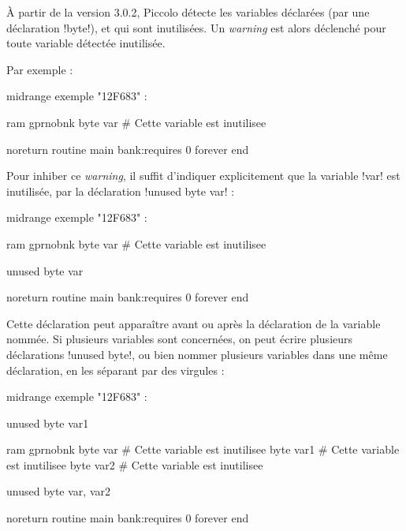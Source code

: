 
À partir de la version 3.0.2, Piccolo détecte les variables déclarées (par une déclaration \pic!byte!), et qui sont inutilisées. Un \emph{warning} est alors déclenché pour toute variable détectée inutilisée.

Par exemple :

\begin{piccolo}
midrange exemple "12F683" :

ram gprnobnk {
  byte var # Cette variable est inutilisee
}

noreturn routine main bank:requires 0 {
  forever
  end
}
\end{piccolo}


Pour inhiber ce \emph{warning}, il suffit d'indiquer explicitement que la variable \pic!var! est inutilisée, par la déclaration \pic!unused byte var! :

\begin{piccolo}
midrange exemple "12F683" :

ram gprnobnk {
  byte var # Cette variable est inutilisee
}

unused byte var

noreturn routine main bank:requires 0 {
  forever
  end
}
\end{piccolo}

Cette déclaration peut apparaître avant ou après la déclaration de la variable nommée. Si plusieurs variables sont concernées, on peut écrire plusieurs déclarations \pic!unused byte!, ou bien nommer plusieurs variables dans une même déclaration, en les séparant par des virgules :

\begin{piccolo}
midrange exemple "12F683" :

unused byte var1

ram gprnobnk {
  byte var # Cette variable est inutilisee
  byte var1 # Cette variable est inutilisee
  byte var2 # Cette variable est inutilisee
}

unused byte var, var2

noreturn routine main bank:requires 0 {
  forever
  end
}
\end{piccolo}



